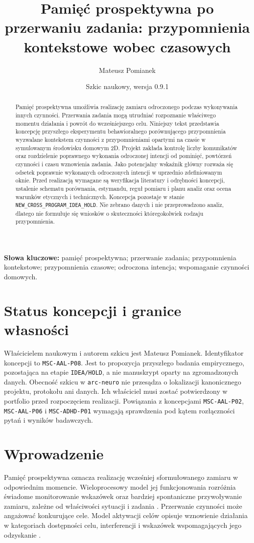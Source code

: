 \documentclass[11pt,a4paper]{article}
\title{Pamięć prospektywna po przerwaniu zadania: przypomnienia kontekstowe wobec czasowych}
\author{Mateusz Pomianek}
\date{Szkic naukowy, wersja 0.9.1}
\begin{document}
\maketitle

\begin{abstract}
Pamięć prospektywna umożliwia realizację zamiaru odroczonego podczas wykonywania innych czynności. Przerwania zadania mogą utrudniać rozpoznanie właściwego momentu działania i powrót do wcześniejszego celu. Niniejszy tekst przedstawia koncepcję przyszłego eksperymentu behawioralnego porównującego przypomnienia wyzwalane kontekstem czynności z przypomnieniami opartymi na czasie w symulowanym środowisku domowym 2D. Projekt zakłada kontrolę liczby komunikatów oraz rozdzielenie poprawnego wykonania odroczonej intencji od pominięć, powtórzeń czynności i czasu wznowienia zadania. Jako potencjalny wskaźnik główny rozważa się odsetek poprawnie wykonanych odroczonych intencji w uprzednio zdefiniowanym oknie. Przed realizacją wymagane są weryfikacja literatury i odrębności koncepcji, ustalenie schematu porównania, estymandu, reguł pomiaru i planu analiz oraz ocena warunków etycznych i technicznych. Koncepcja pozostaje w stanie \texttt{NEW\_CROSS\_PROGRAM\_IDEA\_HOLD}. Nie zebrano danych i nie przeprowadzono analiz, dlatego nie formułuje się wniosków o skuteczności któregokolwiek rodzaju przypomnienia.
\end{abstract}

\noindent\textbf{Słowa kluczowe:} pamięć prospektywna; przerwanie zadania; przypomnienia kontekstowe; przypomnienia czasowe; odroczona intencja; wspomaganie czynności domowych.

\section{Status koncepcji i granice własności}
Właścicielem naukowym i autorem szkicu jest Mateusz Pomianek. Identyfikator koncepcji to \texttt{MSC-AAL-P08}. Jest to propozycja przyszłego badania empirycznego, pozostająca na etapie \texttt{IDEA/HOLD}, a nie manuskrypt oparty na zgromadzonych danych. Obecność szkicu w \texttt{arc-neuro} nie przesądza o lokalizacji kanonicznego projektu, protokołu ani danych. Ich właściciel musi zostać potwierdzony w portfolio przed rozpoczęciem realizacji. Powiązania z koncepcjami \texttt{MSC-AAL-P02}, \texttt{MSC-AAL-P06} i \texttt{MSC-ADHD-P01} wymagają sprawdzenia pod kątem rozłączności pytań i wyników badawczych.

\section{Wprowadzenie}
Pamięć prospektywna oznacza realizację wcześniej sformułowanego zamiaru w odpowiednim momencie. Wieloprocesowy model jej funkcjonowania rozróżnia świadome monitorowanie wskazówek oraz bardziej spontaniczne przywoływanie zamiaru, zależne od właściwości sytuacji i zadania \cite{McDanielEinstein2000}. Przerwanie czynności może angażować konkurujące cele. Model aktywacji celów opisuje wznowienie działania w kategoriach dostępności celu, interferencji i wskazówek wspomagających jego odzyskanie \cite{AltmannTrafton2002}.
\end{document}
